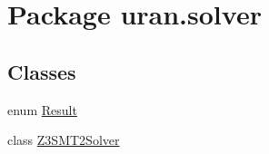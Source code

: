 \hypertarget{namespaceuran_1_1solver}{}\section{Package uran.\+solver}
\label{namespaceuran_1_1solver}
\subsection*{Classes}
\begin{DoxyCompactItemize}
\item 
enum \hyperlink{enumuran_1_1solver_1_1_result}{Result}
\item 
class \hyperlink{classuran_1_1solver_1_1_z3_s_m_t2_solver}{Z3\+S\+M\+T2\+Solver}
\end{DoxyCompactItemize}

